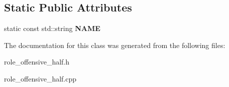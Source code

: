\subsection*{Static Public Attributes}
\begin{DoxyCompactItemize}
\item 
\hypertarget{classRoleOffensiveHalf_a547866d00d3433ebd610621bc40c3b1b}{
static const std::string {\bfseries NAME}}
\label{classRoleOffensiveHalf_a547866d00d3433ebd610621bc40c3b1b}

\end{DoxyCompactItemize}


The documentation for this class was generated from the following files:\begin{DoxyCompactItemize}
\item 
role\_\-offensive\_\-half.h\item 
role\_\-offensive\_\-half.cpp\end{DoxyCompactItemize}
